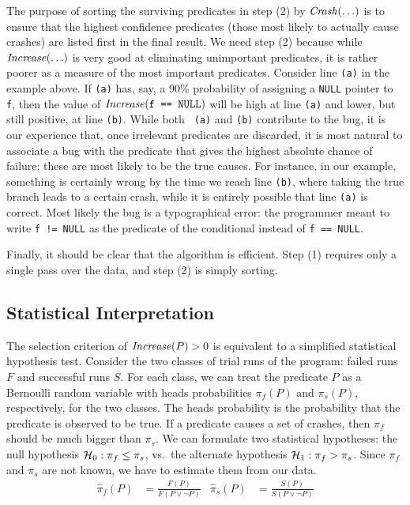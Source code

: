 The purpose of sorting the surviving predicates in step (2) by
$\mbox{\textit{Crash}}(\ldots)$ is to ensure that the highest confidence predicates (those
most likely to actually cause crashes) are listed first in the final
result.  We need step (2) because while $\mbox{\textit{Increase}}(\ldots)$ is very good at
eliminating unimportant predicates, it is rather poorer as a measure
of the most important predicates.  Consider line {\tt (a)} in the
example above.  If {\tt (a)} has, say, a 90\% probability of assigning
a {\tt NULL} pointer to {\tt f}, then the value of
$\mbox{\textit{Increase}}(\mbox{\tt f == NULL})$ will be high at line {\tt (a)}
and lower, but still positive, at line {\tt (b)}.  While both {\tt
(a)} and {\tt (b)} contribute to the bug, it is our experience that,
once irrelevant predicates are discarded, it is most natural to
associate a bug with the predicate that gives the highest absolute
chance of failure; these are most likely to be the true causes.  For
instance, in our example, something is certainly wrong by the time we
reach line {\tt (b)}, where taking the true branch leads to a certain
crash, while it is entirely possible that line {\tt (a)} is correct.
Most likely the bug is a typographical error: the programmer meant to
write {\tt f != NULL} as the predicate of the conditional instead of
{\tt f == NULL}.

Finally, it should be clear that the algorithm is efficient.
Step (1) requires only a single pass over the data, and step (2) is
simply sorting.

\subsection{Statistical Interpretation}

The selection criterion of $\mbox{\textit{Increase}}(P) > 0$ is equivalent to a simplified
statistical hypothesis test.  Consider the two classes of trial runs
of the program: failed runs $F$ and successful runs $S$.  For each
class, we can treat the predicate $P$ as a Bernoulli random variable
with heads probabilities $\pi_f(P)$ and $\pi_s(P)$, respectively, for the
two classes.  The heads
probability is the probability that the predicate is observed to be
true.  If a predicate causes a set of crashes, then $\pi_f$ should be
much bigger than $\pi_s$.  We can formulate two statistical hypotheses:
the null hypothesis ${\mathcal{H}}_0:
\pi_f \leq \pi_s$, vs.\ the alternate hypothesis ${\mathcal{H}}_1: \pi_f > \pi_s$.  Since
$\pi_f$ and $\pi_s$ are not known, we have to estimate them from our
data.
\begin{align*}
  \hat \pi_f(P) &= \frac{F(P)}{F(P \lor \lnot P)} &
  \hat \pi_s(P) &= \frac{S(P)}{S(P \lor \lnot P)}
\end{align*}

